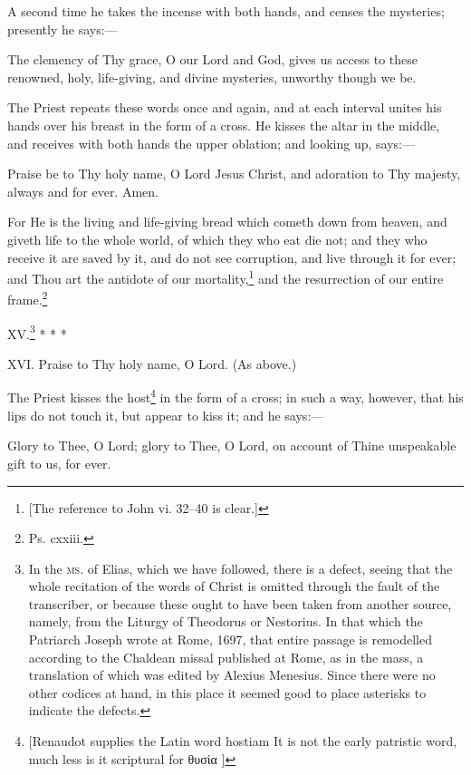 A second time he takes the incense with both hands, and censes the mysteries; presently he says:—

The clemency of Thy grace, O our Lord and God, gives us access to these renowned, holy, life-giving, and divine mysteries, unworthy though we be.

The Priest repeats these words once and again, and at each interval unites his hands over his breast in the form of a cross. He kisses the altar in the middle, and receives with both hands the upper oblation; and looking up, says:—

Praise be to Thy holy name, O Lord Jesus Christ, and adoration to Thy majesty, always and for ever. Amen.

For He is the living and life-giving bread which cometh down from heaven, and giveth life to the whole world, of which they who eat die not; and they who receive it are saved by it, and do not see corruption, and live through it for ever; and Thou art the antidote of our mortality,\footnote{\par{}  [The reference to John vi. 32–40 is clear.]} and the resurrection of our entire frame.\footnote{\par  Ps. cxxiii.}

XV.\footnote{\par  In the \textsc{ms}. of Elias, which we have followed, there is a defect, seeing that the whole recitation of the words of Christ is omitted through the fault of the transcriber, or because these ought to have been taken from another source, namely, from the Liturgy of Theodorus or Nestorius. In that which the Patriarch Joseph wrote at Rome, 1697, that entire passage is remodelled according to the Chaldean missal published at Rome, as in the mass, a translation of which was edited by Alexius Menesius. Since there were no other codices at hand, in this place it seemed good to place asterisks to indicate the defects.} * * *

XVI. Praise to Thy holy name, O Lord. (As above.)

The Priest kisses the host\footnote{\par{}  [Renaudot supplies the Latin word hostiam It is not the early patristic word, much less is it scriptural for \textgreek{θυσία} ]} in the form of a cross; in such a way, however, that his lips do not touch it, but appear to kiss it; and he says:—

Glory to Thee, O Lord; glory to Thee, O Lord, on account of Thine unspeakable gift to us, for ever.

